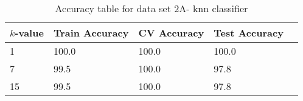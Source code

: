 \def\arraystretch{1.25}
\begin{table}[H]
\centering
\begin{tabular}{l l l l l}
\hline
\hline
\textbf{$k$-value} & \textbf{Train Accuracy} & \textbf{CV Accuracy} & \textbf{Test Accuracy}\\
\hline
\hline
1 & 100.0 & 100.0 & 100.0 \\
7 & 99.5 & 100.0 & 97.8 \\
15 & 99.5 & 100.0 & 97.8 \\
\hline
\end{tabular}
\caption{Accuracy table for data set 2A- knn classifier}
\end{table}
